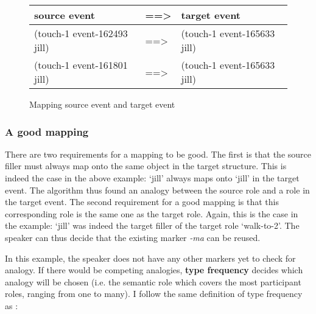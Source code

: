 \begin{figure}[h]
 \begin{tabular}{lll} 
{\bfseries source event} & {\bfseries ==>} & {\bfseries target event} \\
\midrule
(touch-1 event-162493 jill) &  ==> & (touch-1 event-165633 jill)\\
(touch-1 event-161801 jill) & ==> &  (touch-1 event-165633 jill)\\
\end{tabular} 
\caption{Mapping source event and target event}
\label{fig:3:mapping}
\end{figure}

\subsubsection{A good mapping}
 There are two requirements for a mapping to be good. The first is that the source filler must always map onto the same object in the target structure. This is indeed the case in the above example: `jill' always maps onto `jill' in the target event. The algorithm thus found an analogy between the source role and a role in the target event. The second requirement for a good mapping is that this corresponding role is the same one as the target role. Again, this is the case in the example: `jill' was indeed the target filler of the target role `walk-to-2'. The speaker can thus decide that the existing marker {\em -ma} can be reused.

In this example, the speaker does not have any other markers yet to check for analogy. If there would be competing analogies, {\bfseries type frequency} decides which analogy will be chosen (i.e. the semantic role which covers the most participant roles, ranging from one to many). I follow the same definition of type frequency as \citet[77]{bybee00three}:

